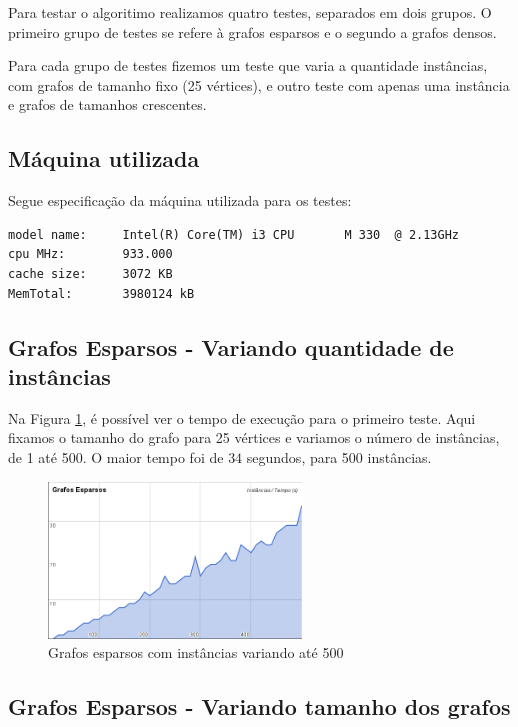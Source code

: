 \documentclass[12pt]{article}
\begin{document}
Para testar o algoritimo realizamos quatro testes, separados em dois grupos. O primeiro grupo de testes se refere à grafos esparsos e o segundo a grafos densos.

Para cada grupo de testes fizemos um teste que varia a quantidade instâncias, com grafos de tamanho fixo (25 vértices), e outro teste com apenas uma instância e grafos de tamanhos crescentes.

\subsection{Máquina utilizada}
\label{maquina}

Segue especificação da máquina utilizada para os testes:
\begin{verbatim}
model name:     Intel(R) Core(TM) i3 CPU       M 330  @ 2.13GHz
cpu MHz:        933.000
cache size:     3072 KB
MemTotal:       3980124 kB
\end{verbatim}

\subsection{Grafos Esparsos - Variando quantidade de instâncias}
\label{esparsos_inst}

	Na Figura \ref{esp_inst_var}, é possível ver o tempo de execução para o primeiro teste. Aqui fixamos o tamanho do grafo para 25 vértices e variamos o número de instâncias, de 1 até 500. O maior tempo foi de $34$ segundos, para 500 instâncias.

\begin{figure}[h!]
	\centering
	\includegraphics[width=0.60\textwidth]{graph_esparso_instvar.png}
	\caption{Grafos esparsos com instâncias variando até 500}
	\label{esp_inst_var}
\end{figure}

\subsection{Grafos Esparsos - Variando tamanho dos grafos}
\label{esparsos_graf}
\end{document}
